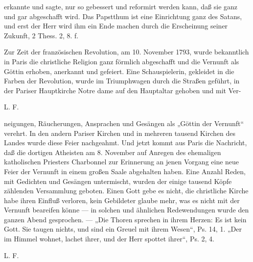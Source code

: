 erkannte und sagte, nur so gebessert und reformirt werden kann, daß sie ganz und gar abgeschafft wird. Das Papstthum ist eine Einrichtung ganz des Satans, und erst der Herr wird ihm ein Ende machen durch die Erscheinung seiner Zukunft, 2 Thess. 2, 8. f.

Zur Zeit der französischen Revolution, am 10. November 1793, wurde bekanntlich in Paris die christliche Religion ganz förmlich abgeschafft und die Vernunft als Göttin erhoben, anerkannt und gefeiert. Eine Schauspielerin, gekleidet in die Farben der Revolution, wurde im Triumphwagen durch die Straßen geführt, in der Pariser Hauptkirche Notre dame auf den Hauptaltar gehoben und mit Ver-

L. F.

neigungen, Räucherungen, Ansprachen und Gesängen als „Göttin der Vernunft“ verehrt. In den andern Pariser Kirchen und in mehreren tausend Kirchen des Landes wurde diese Feier nachgeahmt. Und jetzt kommt aus Paris die Nachricht, daß die dortigen Atheisten am 8. November auf Anregen des ehemaligen katholischen Priesters Charbonnel zur Erinnerung an jenen Vorgang eine neue Feier der Vernunft in einem großen Saale abgehalten haben. Eine Anzahl Reden, mit Gedichten und Gesängen untermischt, wurden der einige tausend Köpfe zählenden Versammlung geboten. Einen Gott gebe es nicht, die christliche Kirche habe ihren Einfluß verloren, kein Gebildeter glaube mehr, was es nicht mit der Vernunft beareifen könne — in solchen und ähnlichen Redewendungen wurde den ganzen Abend gesprochen. — „Die Thoren sprechen in ihrem Herzen: Es ist kein Gott. Sie taugen nichts, und sind ein Greuel mit ihrem Wesen“, Ps. 14, 1. „Der im Himmel wohnet, lachet ihrer, und der Herr spottet ihrer“, Ps. 2, 4.

L. F.

